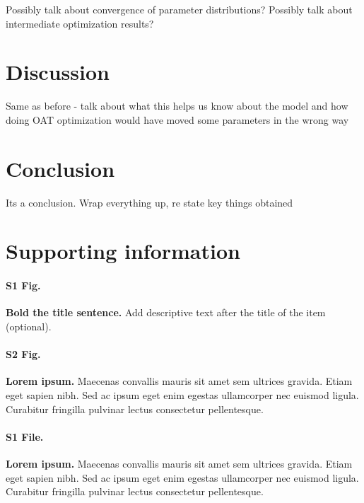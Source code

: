 \documentclass[10pt,letterpaper]{article}
\begin{document}
	\bigskip
	
	Possibly talk about convergence of parameter distributions? Possibly talk about intermediate optimization results?
	
	
	\section*{Discussion}
	
	Same as before - talk about what this helps us know about the model and how doing OAT optimization would have moved some parameters in the wrong way
	
	
	\section*{Conclusion}
	
	Its a conclusion. Wrap everything up, re state key things obtained
	
	
	\section*{Supporting information}
	
	\paragraph*{S1 Fig.}
	\label{S1_Fig}
	{\bf Bold the title sentence.} Add descriptive text after the title of the item (optional).
	
	\paragraph*{S2 Fig.}
	\label{S2_Fig}
	{\bf Lorem ipsum.} Maecenas convallis mauris sit amet sem ultrices gravida. Etiam eget sapien nibh. Sed ac ipsum eget enim egestas ullamcorper nec euismod ligula. Curabitur fringilla pulvinar lectus consectetur pellentesque.
	
	\paragraph*{S1 File.}
	\label{S1_File}
	{\bf Lorem ipsum.}  Maecenas convallis mauris sit amet sem ultrices gravida. Etiam eget sapien nibh. Sed ac ipsum eget enim egestas ullamcorper nec euismod ligula. Curabitur fringilla pulvinar lectus consectetur pellentesque.
	
\end{document}
